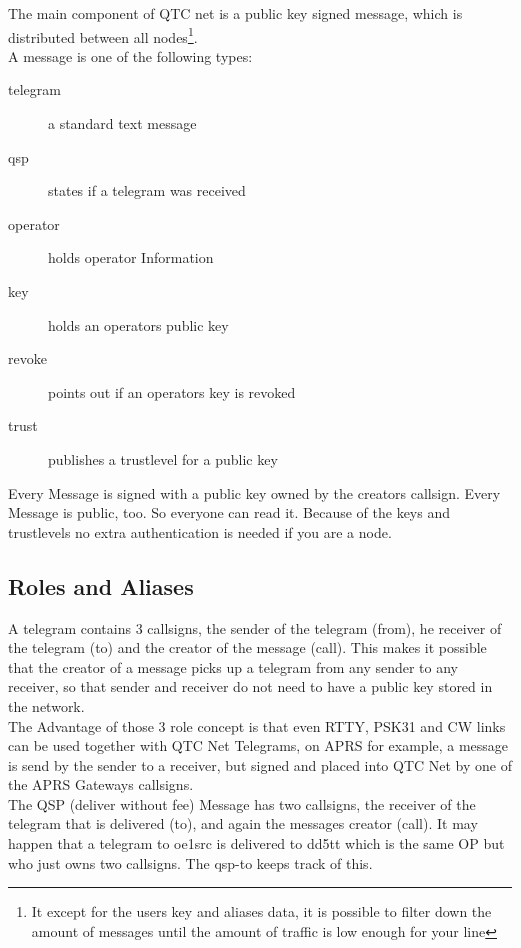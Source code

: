 \documentclass{article}
\begin{document}
The main component of QTC net is a public key signed message, which is
distributed between all nodes\footnote{It except for the users key and 
aliases data, it is possible to filter down the amount of messages 
until the amount of traffic is low enough for your line}.\\

A message is one of the following types: 

\begin{description}
	\item[telegram] a standard text message
	\item[qsp] states if a telegram was received
	\item[operator] holds operator Information
	\item[key] holds an operators public key
	\item[revoke] points out if an operators key is revoked
	\item[trust] publishes a trustlevel for a public key
\end{description}


Every Message is signed with a public key owned by the creators callsign. 
Every Message is public, too. So everyone can read it. Because of the keys 
and trustlevels no extra authentication is needed if you are a node. \\

\subsection{Roles and Aliases}

A telegram contains 3 callsigns, the sender of the telegram (from), he 
receiver of the telegram (to) and the creator of the message (call). This 
makes it possible that the creator of a message picks up a telegram from any 
sender to any receiver, so that sender and receiver do not need to have a 
public key stored in the network.\\

The Advantage of those 3 role concept is that even RTTY, PSK31 and CW links 
can be used together with QTC Net Telegrams, on APRS for example, a message 
is send by the sender to a receiver, but signed and placed into QTC Net by 
one of the APRS Gateways callsigns.\\ 

The QSP (deliver without fee) Message has two callsigns, the receiver of 
the telegram that is delivered (to), and again the messages creator (call). It
may happen that a telegram to oe1src is delivered to dd5tt which is the same OP
but who just owns two callsigns. The qsp-to keeps track of this. \\
\end{document}
